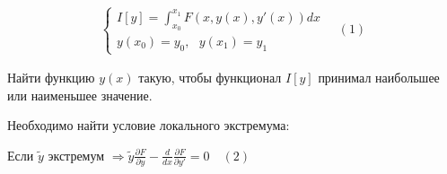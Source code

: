 \documentclass[12pt, a4paper]{report}
\begin{document}
\fi


\[ \begin{aligned}
\begin{cases}
    \displaystyle I[y] = \int_{x_0}^{x_1} F(x,y(x),y'(x))dx \\
    y(x_0)=y_0, \text{ } y(x_1)=y_1
\end{cases}
\quad (1)
\end{aligned} \] 

Найти функцию \( y(x) \)   такую, чтобы функционал \( I[y] \) принимал наибольшее или наименьшее значение. 

Необходимо найти условие локального экстремума: 

Если \( \tilde{y }       \)  экстремум \( \Rightarrow \tilde{y }  \frac{\partial F }{\partial y} - \frac{d}{dx }  \frac{\partial F}{\partial y '} = 0 \quad (2)   \)
\end{document}

